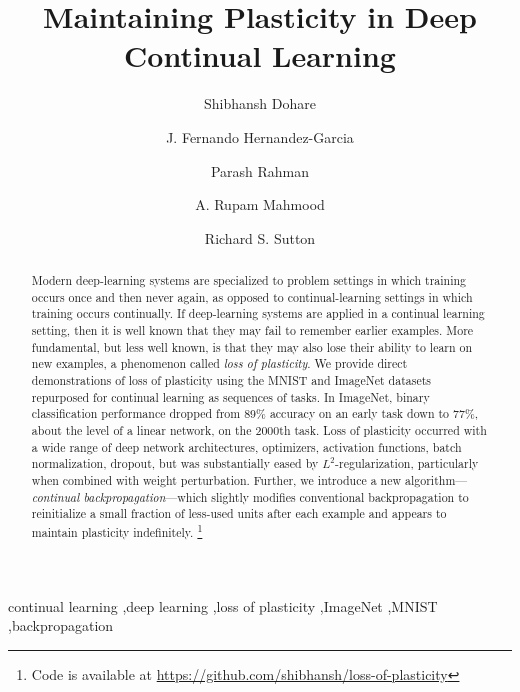 \documentclass[review, number,3p]{elsarticle}
\begin{document}
\begin{frontmatter}

\title{Maintaining Plasticity in Deep Continual Learning}

\author[inst1]{Shibhansh Dohare}

\author[inst1]{J. Fernando Hernandez-Garcia}

\author[inst1]{Parash Rahman}

\author[inst1,inst2]{A. Rupam Mahmood}

\author[inst1,inst2]{Richard S. Sutton}



           
\begin{abstract}%

Modern deep-learning systems are specialized to problem settings in which training occurs once and then never again, as opposed to continual-learning settings in which training occurs continually. 
If deep-learning systems are applied in a continual learning setting, then it is well known that they may fail to remember earlier examples.
More fundamental, but less well known, is that they may also lose their ability to learn on new examples, a phenomenon called \textit{loss of plasticity}.
We provide direct demonstrations of loss of plasticity using the MNIST and ImageNet datasets repurposed for continual learning as sequences of tasks. 
In ImageNet, binary classification performance dropped from 89\% accuracy on an early task down to 77\%, about the level of a linear network, on the 2000th task. 
Loss of plasticity occurred with a wide range of deep network architectures, optimizers, activation functions, batch normalization, dropout, but was substantially eased by $L^2$-regularization, particularly when combined with weight perturbation. 
Further, we introduce a new algorithm---\emph{continual backpropagation}---which slightly modifies conventional backpropagation to reinitialize a small fraction of less-used units after each example and appears to maintain plasticity indefinitely.
\footnote{Code is available at \href{https://github.com/shibhansh/loss-of-plasticity}{https://github.com/shibhansh/loss-of-plasticity}}


\end{abstract}

\begin{keyword}
continual learning \sep deep learning \sep loss of plasticity \sep ImageNet \sep MNIST \sep backpropagation
\end{keyword}

\end{frontmatter}
\end{document}
